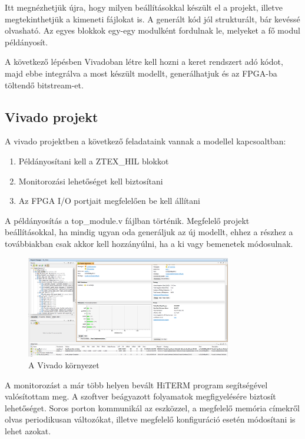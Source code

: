 Itt megnézhetjük újra, hogy milyen beállításokkal készült el a projekt, illetve megtekinthetjük a kimeneti fájlokat is. A generált kód jól strukturált, bár kevéssé olvasható. Az egyes blokkok egy-egy modulként fordulnak le, melyeket a fő modul példányosít.

A következő lépésben Vivadoban létre kell hozni a keret rendszert adó kódot, majd ebbe integrálva a most készült modellt, generálhatjuk és az FPGA-ba töltendő bitstream-et.

\subsection{Vivado projekt}

A vivado projektben a következő feladataink vannak a modellel kapcsoaltban:
\begin{enumerate}
	\item{Példányosítani kell a ZTEX\_HIL blokkot}
	\item{Monitorozási lehetőséget kell biztosítani}
	\item{Az FPGA I/O portjait megfelelően be kell állítani}
\end{enumerate}

A példányosítás a top\_module.v fájlban történik. Megfelelő projekt beállításokkal, ha mindig ugyan oda generáljuk az új modellt, ehhez a részhez a továbbiakban csak akkor kell hozzányúlni, ha a ki vagy bemenetek módosulnak.

\begin{figure}[H]
	\centering
	\includegraphics[width = 0.8\textwidth]{figures/vivado.png}
	\caption{A Vivado környezet} 
	\label{fig:hdl_report}
\end{figure}

A monitorozást a már több helyen bevált HiTERM program segítségével valósítottam meg. A szoftver beágyazott folyamatok megfigyelésére biztosít lehetőséget. Soros porton kommunikál az eszközzel, a megfelelő memória címekről olvas periodikusan változókat, illetve megfelelő konfiguráció esetén módosítani is lehet azokat.